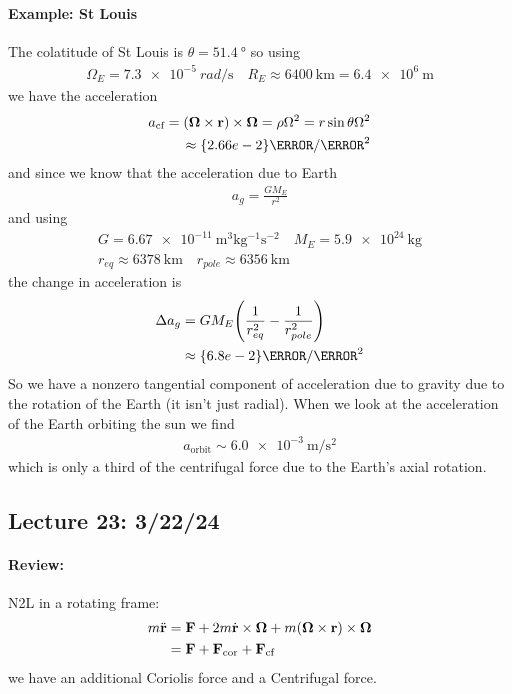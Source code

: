 \documentclass[../main.tex]{subfiles}
\begin{document}
\paragraph*{Example: St Louis} The colatitude of St Louis is $\theta = \qty{51.4}{\degree}$ so
using
\begin{align*}
    \Omega_E = \qty{7.3e-5}{rad\per\s} \quad R_E \approx \qty{6400}{\km} = \qty{6.4e6}{\m}
\end{align*}
we have the acceleration
\begin{align*}
    a_{\text{cf}} = (\vb \Omega \times \vb r) \times \vb \Omega = \rho \Omega^2 = r \sin\theta \Omega^2 \\
    \approx \qty{2.66e-2}{\m/\s^2}
\end{align*}
and since we know that the acceleration due to Earth
\begin{align*}
    a_g = \frac{GM_E}{r^2}
\end{align*}
and using
\begin{align*}
    G = \qty{6.67e-11}{\m^3\kg^{-1}\s^{-2}} \quad M_E = \qty{5.9e24}{\kg} \\
    r_{eq} \approx \qty{6378}{\km} \quad r_{pole} \approx \qty{6356}{\km}
\end{align*}
the change in acceleration is
\begin{align*}
    \Delta a_g &= GM_E\qt(\frac{1}{r_{eq}^2} - \frac{1}{r_{pole}^2}) \\
    &\approx \qty{6.8e-2}{\m/\s^2}
\end{align*}
So we have a nonzero tangential component of acceleration due to gravity due to the rotation of the
Earth (it isn't just radial). When we look at the acceleration of the Earth orbiting the sun we find
\begin{align*}
    a_{\text{orbit}} \sim \qty{6.0e-3}{\m/\s^2}
\end{align*}
which is only a third of the centrifugal force due to the Earth's axial rotation.

\newpage
\subsection*{Lecture 23: \hfill 3/22/24}
\paragraph*{Review:} N2L in a rotating frame:
\begin{align*}
    m\ddot{\vb r} &= \vb F + 2m \dot{\vb r} \times \vb \Omega + m(\vb \Omega \times \vb r) \times \vb \Omega \\
    &= \vb F + \vb F_{\text{cor}} + \vb F_{\text{cf}}
\end{align*}
we have an additional Coriolis force and a Centrifugal force. 
\end{document}
